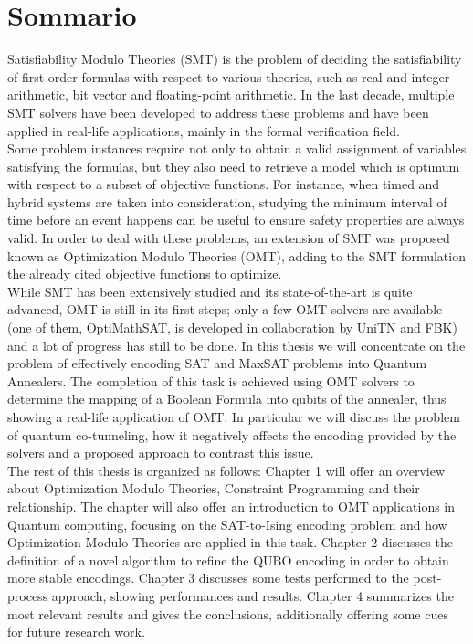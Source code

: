 \chapter*{Sommario} %
\label{sommario}

Satisfiability Modulo Theories (SMT) is the problem of deciding the satisfiability of first-order formulas with respect to various theories, such as real and integer arithmetic, bit vector and floating-point arithmetic. In the last decade, multiple SMT solvers have been developed to address these problems and have been applied in real-life applications, mainly in the formal verification field. \\
Some problem instances require not only to obtain a valid assignment of variables satisfying the formulas, but they also need to retrieve a model which is optimum with respect to a subset of objective functions. For instance, when timed and hybrid systems are taken into consideration, studying the minimum interval of time before an event happens can be useful to ensure safety properties are always valid. In order to deal with these problems, an extension of SMT was proposed known as Optimization Modulo Theories (OMT), adding to the SMT formulation the already cited objective functions to optimize. \\
While SMT has been extensively studied and its state-of-the-art is quite advanced, OMT is still in its first steps; only a few OMT solvers are available (one of them, OptiMathSAT, is developed in collaboration by UniTN and FBK) and a lot of progress has still to be done. In this thesis we will concentrate on the problem of effectively encoding SAT and MaxSAT problems into Quantum Annealers. The completion of this task is achieved using OMT solvers to determine the mapping of a Boolean Formula into qubits of the annealer, thus showing a real-life application of OMT. In particular we will discuss the problem of quantum co-tunneling, how it negatively affects the encoding provided by the solvers and a proposed approach to contrast this issue. \\
The rest of this thesis is organized as follows: Chapter 1 will offer an overview about Optimization Modulo Theories, Constraint Programming and their relationship. The chapter will also offer an introduction to OMT applications in Quantum computing, focusing on the SAT-to-Ising encoding problem and how Optimization Modulo Theories are applied in this task. Chapter 2 discusses the definition of a novel algorithm to refine the QUBO encoding in order to obtain more stable encodings. Chapter 3 discusses some tests performed to the post-process approach, showing performances and results. Chapter 4 summarizes the most relevant results and gives the conclusions, additionally offering some cues for future research work.

\pagebreak






